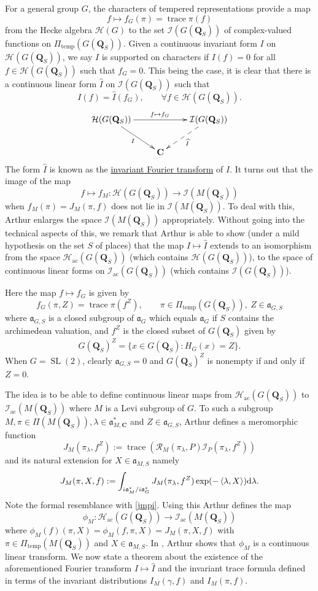 \documentclass[11pt]{amsart}
\def\C{\mathbf C}
\def\Q{\mathbf Q}
\def\HHH{\mathcal H}
\def\III{\mathcal I}
\def\aaa{\mathfrak a}
\def\d{\text d}
\def\RRR{\mathcal R}
\def\sl{\operatorname{SL}}
\def\sprod#1#2{\left\langle #1 , #2 \right\rangle}  %
\def\trace{\operatorname{trace}}
\theoremstyle{remark}
\begin{document}
For a general group $G$, the characters of tempered representations provide a map
\[ f \mapsto f_G(\pi) = \trace \pi(f) \]
from the Hecke algebra $\HHH(G)$ to the set $\III(G(\Q_S))$ of complex-valued functions on $\Pi_{\text{temp}}(G(\Q_S))$. Given a continuous invariant form $I$ on $\HHH(G(\Q_S))$, we say $I$ is supported on characters if $I(f) = 0$ for all $f \in \HHH(G(\Q_S))$ such that $f_G = 0$. This being the case, it is clear that there is a continuous linear form $\widehat I$ on $\III(G(\Q_S))$ such that 
\[ I(f) = \widehat I(f_G), \qquad \forall f \in \HHH(G(\Q_S)). \]
\[ \xymatrix{ \HHH(G(\Q_S)) \ar[rr]^{f \mapsto f_G} \ar[dr]_I && \III(G(\Q_S)) \ar@{-->}[dl]^{\widehat I} \\ & \C & }
\]
The form $\widehat I$ is known as the \underline{invariant Fourier transform} of $I$. It turns out that the image of the map
\[ f \mapsto f_M : \HHH(G(\Q_S)) \to \III(M(\Q_S)) \]
when $f_M(\pi) = J_M(\pi, f)$ does not lie in $\III(M(\Q_S))$. To deal with this, Arthur enlarges the space $\III(M(\Q_S))$ appropriately. Without going into the technical aspects of this, we remark that Arthur is able to show (under a mild hypothesis on the set $S$ of places) that the map $I \mapsto \widehat I$ extends to an isomorphism from the space $\HHH_{\text{ac}}(G(\Q_S))$ (which contains $\HHH(G(\Q_S))$), to the space of continuous linear forms on $\III_{\text{ac}}(G(\Q_S))$ (which contains $\III(G(\Q_S))$).

Here the map $f \mapsto f_G$ is given by
\[ f_G(\pi, Z) = \trace \pi(f^Z), \qquad \pi \in \Pi_{\text{temp}}(G(\Q_S)), \ Z \in \aaa_{G, S} \]
where $\aaa_{G, S}$ is a closed subgroup of $\aaa_G$ which equals $\aaa_G$ if $S$ contains the archimedean valuation, and $f^Z$ is the closed subset of $G(\Q_S)$ given by
\[ G(\Q_S)^Z = \{ x \in G(\Q_S) : H_G(x) = Z \}. \]
When $G = \sl(2)$, clearly $\aaa_{G, S} = 0$ and $G(\Q_S)^Z$ is nonempty if and only if $Z = 0$. 

The idea is to be able to define continuous linear maps from $\HHH_{\text{ac}}(G(\Q_S))$ to $\III_{\text{ac}}(M(\Q_S))$ where $M$ is a Levi subgroup of $G$. To such a subgroup $M, \pi \in \Pi(M(\Q_S)), \lambda \in \aaa_{M, \C}^*$ and $Z \in \aaa_{G, S}$, Arthur defines a meromorphic function
\[ J_M(\pi_\lambda, f^Z) := \trace \left( \RRR_M(\pi_\lambda, P) \III_P(\pi_\lambda, f^Z) \right) \]
and its natural extension for $X \in \aaa_{M, S}$ namely
\[ J_M(\pi, X, f) := \int_{i\aaa_M^* / i\aaa_G^*} J_M(\pi_\lambda, f^Z) \exp(-\sprod{\lambda}{X}) \d \lambda. \]
Note the formal resemblance with \cref{jmpi}. Using this Arthur defines the map
\[ \phi_M : \HHH_{\text{ac}}(G(\Q_S)) \to \III_{\text{ac}}(M(\Q_S)) \]
where $\phi_M(f)(\pi, X) = \phi_M(f, \pi, X) = J_M(\pi, X, f)$ with $\pi \in \Pi_{\text{temp}}(M(\Q_S))$ and $X \in \aaa_{M, S}$. In \cite{MR999488}, Arthur shows that $\phi_M$ is a continuous linear transform. We now state a theorem about the existence of the aforementioned Fourier transform $I \mapsto \widehat I$ and the invariant trace formula defined in terms of the invariant distributions $I_M(\gamma, f)$ and $I_M(\pi, f)$. 
\end{document}
